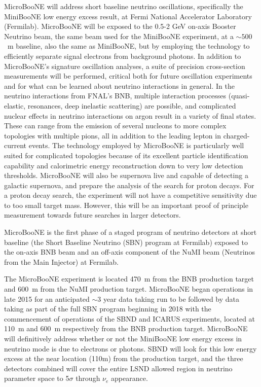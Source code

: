 MicroBooNE will address short baseline neutrino oscillations, specifically the MiniBooNE low energy excess result, at Fermi National Accelerator Laboratory (Fermilab).  MicroBooNE will be exposed to the  0.5-2 GeV on-axis Booster Neutrino beam, the same beam used for the MiniBooNE experiment, at a $\sim 500$~m baseline, also the same as MiniBooNE, but by employing the \lartpc technology to efficiently separate signal electrons from background photons.  In addition to MicroBooNE's signature oscillation analyses, a suite of precision cross-section measurements will be performed, critical both for future \lartpc oscillation experiments and for what can be learned about neutrino interactions in general.   In the neutrino interactions from FNAL's BNB, multiple interaction processes (quasi-elastic, resonances, deep inelastic scattering) are possible, and complicated nuclear effects in neutrino interactions on argon result in a variety of final states. These can range from the emission of several nucleons to more complex topologies with multiple pions, all in addition to the leading lepton in charged-current events. The \lartpc technology employed by MicroBooNE is particularly well suited for complicated topologies because of its excellent particle identification capability and calorimetric energy reconstruction down to very low detection thresholds. MicroBooNE will also be supernova live and capable of detecting a galactic supernova, and prepare the analysis of  the search for proton decays. For a proton decay search, the experiment will not have a competitive sensitivity due to too small target mass. However, this will be an important proof of principle measurement towards future searches in larger detectors.  

MicroBooNE is the first phase of a staged program of neutrino detectors at short baseline (the Short Baseline Neutrino (SBN) program at Fermilab) exposed to the on-axis BNB beam and an off-axis component of the NuMI beam (Neutrinos from the Main Injector) at Fermilab.  

The MicroBooNE experiment is located 470~m from the BNB production target and 600~m from the NuMI production target.  MicroBooNE began operations in late 2015 for an anticipated $\sim$3 year data taking run to be followed by data taking as part of the full SBN program beginning in 2018 with the commencement of operations of the SBND \cite{Adams:2013-lar1nd} and ICARUS experiments, located at 110~m and 600~m respectively from the BNB production target.  MicroBooNE will definitively address whether or not the MiniBooNE low energy excess in neutrino mode is due to electrons or photons.  SBND will look for this low energy excess at the near location (110m) from the production target, and the three detectors combined will cover the entire LSND allowed region in neutrino parameter space to 5$\sigma$ through $\nu_e$ appearance.

